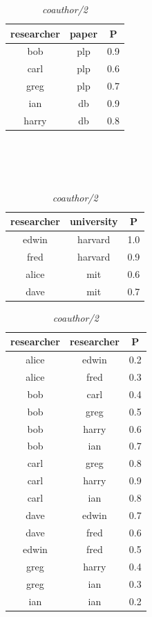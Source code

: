 \documentclass[akbc,twoside,11pt]{article}
\newcounter{example}
\begin{document}
\begin{table}
\begin{small}
\parbox{.48\linewidth}{
\centering
\begin{tabular}{@{}cc|c@{}}
researcher					&paper					&P\\
\hline
bob     					&plp				    &0.9\\
carl						&plp			    	&0.6\\
greg						&plp			    	&0.7\\
ian 						&db		                &0.9\\
harry						&db	                	&0.8\\
\end{tabular}
\caption{\textit{author/2}}\label{t1}
\ \\ \ \\ \ \\
\begin{tabular}{@{}cc|c@{}}
researcher					&university				&P\\
\hline
edwin						&harvard				&1.0\\
fred						&harvard				&0.9\\
alice						&mit					&0.6\\
dave						&mit					&0.7\\
\end{tabular}
\caption{\textit{location/2}}\label{t2}
}
\hfill
\parbox{.48\linewidth}{
\centering
\begin{tabular}{@{}cc|c@{}}
researcher					&researcher				&P\\
\hline
alice						&edwin			    	&0.2\\
alice						&fred					&0.3\\
bob					        &carl					&0.4\\
bob					        &greg					&0.5\\
bob					        &harry					&0.6\\
bob					        &ian			    	&0.7\\
carl						&greg					&0.8\\
carl						&harry					&0.9\\
carl						&ian			    	&0.8\\
dave						&edwin		    		&0.7\\
dave						&fred					&0.6\\
edwin						&fred					&0.5\\
greg						&harry					&0.4\\
greg						&ian		    		&0.3\\
ian						    &ian	    			&0.2\\
\end{tabular}
\caption{\textit{coauthor/2}}\label{t3}
}
\end{small}\label{coauthor_example}
\end{table}
\end{document}
